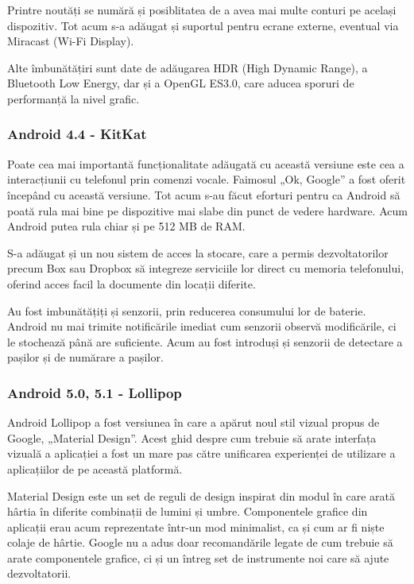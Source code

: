 \documentclass[12pt,a4paper]{article}
\begin{document}
	Printre noutăți se numără și posiblitatea de a avea mai multe conturi pe același dispozitiv. Tot acum s-a adăugat și suportul pentru ecrane externe, eventual via Miracast (Wi-Fi Display).

	Alte îmbunătățiri sunt date de adăugarea HDR (High Dynamic Range), a Bluetooth Low Energy, dar și a OpenGL ES3.0, care aducea sporuri de performanță la nivel grafic.


\subsubsection{Android 4.4 - KitKat}
Poate cea mai importantă funcționalitate adăugată cu această versiune este cea a interacțiunii cu telefonul prin comenzi vocale. Faimosul „Ok, Google” a fost oferit începând cu această versiune. Tot acum s-au făcut eforturi pentru ca Android să poată rula mai bine pe dispozitive mai slabe din punct de vedere hardware. Acum Android putea rula chiar și pe 512 MB de RAM.

	S-a adăugat și un nou sistem de acces la stocare, care a permis dezvoltatorilor precum Box sau Dropbox să integreze serviciile lor direct cu memoria telefonului, oferind acces facil la documente din locații diferite.

	Au fost imbunătățiți și senzorii, prin reducerea consumului lor de baterie. Android nu  mai trimite notificările imediat cum senzorii observă modificările, ci le stochează până are suficiente.  Acum au fost introduși și senzorii de detectare a pașilor și de numărare a pașilor. 
	

\subsubsection{Android 5.0, 5.1 - Lollipop}
Android Lollipop a fost versiunea în care a apărut noul stil vizual propus de Google, „Material Design”. Acest ghid despre cum trebuie să arate interfața vizuală a aplicației a fost un mare pas către unificarea experienței de utilizare a aplicațiilor de pe această platformă.
	
	Material Design este un set de reguli de design inspirat din modul în care arată hârtia în diferite combinații de lumini și umbre.
Componentele grafice din aplicații erau acum reprezentate într-un mod minimalist, ca și cum ar fi niște colaje de hârtie. Google nu a adus doar recomandările legate de cum trebuie să arate componentele grafice, ci și un întreg set de instrumente noi care să ajute dezvoltatorii.
	
\end{document}
